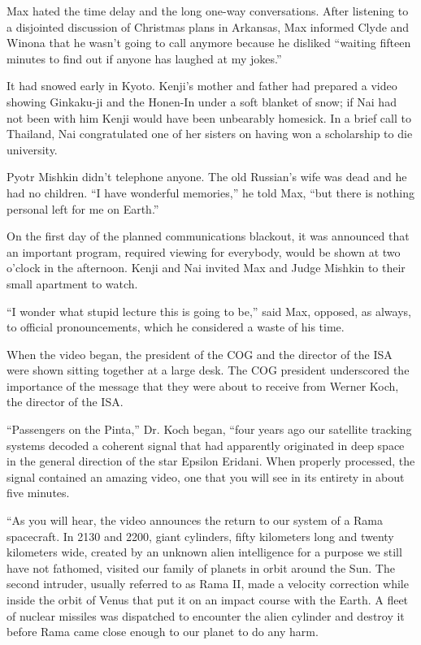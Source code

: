 \documentclass[]{article}
\begin{document}
{Max hated the time delay and the long one-way conversations.  After listening to a disjointed discussion of Christmas plans in Arkansas, Max informed Clyde and Winona that he wasn’t going to call anymore because he disliked “waiting fifteen minutes to find out if anyone has laughed at my jokes.”

It had snowed early in Kyoto.  Kenji’s mother and father had prepared a video showing Ginkaku-ji and the Honen-In under a soft blanket of snow; if Nai had not been with him Kenji would have been unbearably homesick.  In a brief call to Thailand, Nai congratulated one of her sisters on having won a scholarship to die university.

Pyotr Mishkin didn’t telephone anyone.  The old Russian’s wife was dead and he had no children.  “I have wonderful memories,” he told Max, “but there is nothing personal left for me on Earth.”

On the first day of the planned communications blackout, it was announced that an important program, required viewing for everybody, would be shown at two o’clock in the afternoon.  Kenji and Nai invited Max and Judge Mishkin to their small apartment to watch.

“I wonder what stupid lecture this is going to be,” said Max, opposed, as always, to official pronouncements, which he considered a waste of his time.

When the video began, the president of the COG and the director of the ISA were shown sitting together at a large desk.  The COG president underscored the importance of the message that they were about to receive from Werner Koch, the director of the ISA.

“Passengers on the Pinta,” Dr.  Koch began, “four years ago our satellite tracking systems decoded a coherent signal that had apparently originated in deep space in the general direction of the star Epsilon Eridani.  When properly processed, the signal contained an amazing video, one that you will see in its entirety in about five minutes.

“As you will hear, the video announces the return to our system of a Rama spacecraft.  In 2130 and 2200, giant cylinders, fifty kilometers long and twenty kilometers wide, created by an unknown alien intelligence for a purpose we still have not fathomed, visited our family of planets in orbit around the Sun.  The second intruder, usually referred to as Rama II, made a velocity correction while inside the orbit of Venus that put it on an impact course with the Earth.  A fleet of nuclear missiles was dispatched to encounter the alien cylinder and destroy it before Rama came close enough to our planet to do any harm.

}
\end{document}
